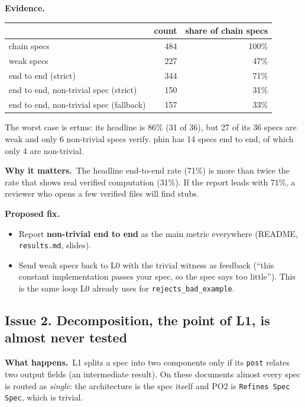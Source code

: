 \documentclass[10pt,a4paper]{article}
\newcommand{\code}[1]{\texttt{\small #1}}
\newcommand{\what}{\par\smallskip\textbf{What happens.}~}
\newcommand{\evidence}{\par\smallskip\textbf{Evidence.}~}
\newcommand{\why}{\par\smallskip\textbf{Why it matters.}~}
\newcommand{\fix}{\par\smallskip\textbf{Proposed fix.}~}
\begin{document}
\evidence
\begin{center}
\begin{tabular}{@{}lrr@{}}
\toprule
 & count & share of chain specs \\
\midrule
chain specs                              & 484 & 100\% \\
weak specs                               & 227 & 47\% \\
end to end (strict)                      & 344 & 71\% \\
end to end, non-trivial spec (strict)    & 150 & 31\% \\
end to end, non-trivial spec (fallback)  & 157 & 33\% \\
\bottomrule
\end{tabular}
\end{center}
The worst case is ertms: its headline is 86\% (31 of 36), but 27 of its 36 specs are weak and only 6 non-trivial specs
verify. phin has 14 specs end to end, of which only 4 are non-trivial.

\why The headline end-to-end rate (71\%) is more than twice the rate that shows real verified computation (31\%). If the report
leads with 71\%, a reviewer who opens a few verified files will find stubs.

\fix
\begin{itemize}
\item Report \textbf{non-trivial end to end} as the main metric everywhere (README, \code{results.md}, slides).
\item Send weak specs back to L0 with the trivial witness as feedback (``this constant implementation passes your spec, so the
      spec says too little''). This is the same loop L0 already uses for \code{rejects\_bad\_example}.
\end{itemize}

\subsection*{Issue 2. Decomposition, the point of L1, is almost never tested}
\what L1 splits a spec into two components only if its \code{post} relates two output fields (an intermediate result). On these
documents almost every spec is routed as \emph{single}: the architecture is the spec itself and PO2 is
\code{Refines Spec Spec}, which is trivial.
\end{document}

